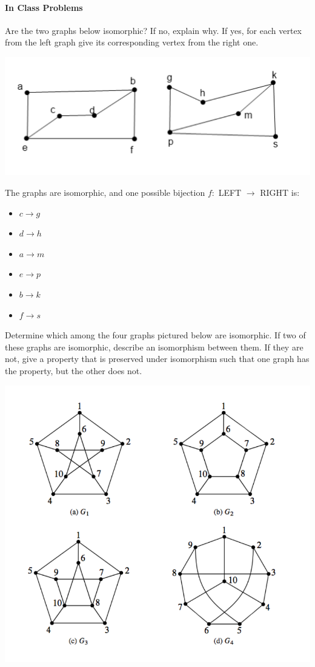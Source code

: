 \documentclass[solution, letterpaper]{cs20inclass}
\begin{document}
\paragraph*{In Class Problems}

\problem Are the two graphs below isomorphic? If no, explain why. If yes, for each vertex from the left graph give its corresponding vertex from the right one.
\begin{center}
\includegraphics[scale=0.5]{isomorphisms.png}
\end{center}

\solution The graphs are isomorphic, and one possible bijection $f: $ LEFT $ \rightarrow $ RIGHT is:
\begin{itemize}
\item[] $ c \rightarrow g $
\item[] $ d \rightarrow h $
\item[] $ a \rightarrow m $
\item[] $ e \rightarrow p $
\item[] $ b \rightarrow k $
\item[] $ f \rightarrow s $
\end{itemize}

\problem Determine which among the four graphs pictured below are isomorphic. If two of these graphs are isomorphic, describe an isomorphism between them. If they are not, give a property that is preserved under isomorphism such that one graph has the property, but the other does not.
\begin{center}
\includegraphics[scale=0.5]{isomorphisms_4.png}
\end{center}
\end{document}

